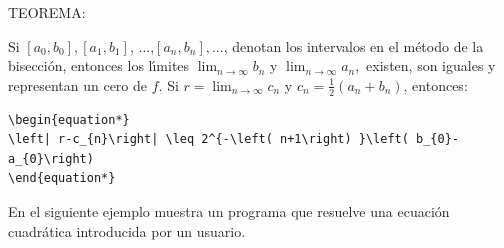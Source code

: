 \documentclass{article}%
\begin{document}
TEOREMA:

Si $\left[  a_{0},b_{0}\right]  ,\left[  a_{1},b_{1}\right]  $, ...,$\left[
a_{n},b_{n}\right]  ,$..., denotan los intervalos en el m\'{e}todo de la
bisecci\'{o}n, entonces los l\'{\i}mites $\lim_{n\rightarrow\infty}b_{n}$ y
$\lim_{n\rightarrow\infty}a_{n},$ existen, son iguales y representan un cero
de $f.$ Si $r=\lim_{n\rightarrow\infty}c_{n}$ y $c_{n}=\frac{1}{2}\left(
a_{n}+b_{n}\right)  $, entonces:
\begin{verbatim}
\begin{equation*}
\left| r-c_{n}\right| \leq 2^{-\left( n+1\right) }\left( b_{0}-a_{0}\right)
\end{equation*}
\end{verbatim}

En el siguiente ejemplo muestra un programa que resuelve una ecuaci\'{o}n
cuadr\'{a}tica introducida por un usuario.
\end{document}
